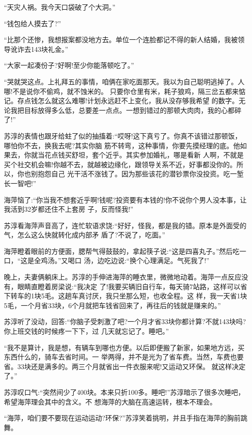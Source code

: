 \documentclass[11pt,a4paper,onecolumn]{article}
\begin{document}
``天灾人祸。我今天口袋破了个大洞。''

``钱包给人摸去了?''

``比那个还惨，我想报案都没地方去。单位一个连脸都记不得的新人结婚，我被领导讹诈去143块礼金。''

``大家一起凑份子?好啊!至少你能落顿吃了。''

``哭就哭这点。上礼拜五的事情，咱俩在家吃面那天。我以为自己聪明逃掉了。人哪!不是说你不偷鸡，就不蚀米的。
只要你仓里有米，耗子狼鸡，隔三岔五都来惦记。存点钱怎么就这么难哪!计划永远赶不上变化，我从没存够我希望
的数字。无论我把目标放得多么低，总要差一点点。一想到错过的那顿大肉肉，我的心都碎了!''

苏淳的表情也跟牙给蛀了似的抽搐着:``哎呀!这下真亏了。你真不该错过那顿饭，哪怕你不去，换我去呢?其实你脑
筋不转弯，这种事情，你要先摸经理的底。他如果去，你就当花点钱买舒坦，套个近乎。其实参加婚礼，哪是看新
人啊，不就是买个社交机会嘛!你越不去，就越被边缘化，跟领导关系不近，好事都没你的。所以，你也别抱怨自己
光干活不涨钱了。因为那些该花的潜钞票你没投资。吃一堑长一智吧!''

海萍恼了:``你当我不想套近乎啊!钱呢?投资要有本钱的!你不说你个男人没本事，让我活到32岁都还住不上套房
子，反而怪我!''

苏淳看海萍声音高了，连忙软语求饶:``好好，怪我，都是我的错。原本是外面受的气，怎么这么快就转化成内部矛
盾了?不说了，吃面。''

海萍瞪着眼前的方便面，腮帮气得鼓鼓的，拿起筷子说:``这是四喜丸子。''然后吃一口，``这是全鸡汤。''又喝口
汤，边吃边说:``换个心理满足。气死我了!''

晚上，夫妻俩躺床上。苏淳的手伸进海萍的睡衣里，微微地动着。海萍一点反应没有，眼睛直瞪着房梁说:``我决定
了!我要买辆旧自行车，每天骑7站路，这样可以省下转车的1块5毛。这趟车真讨厌，我只坐那么短，也收全程。这
样，我一天省1块5毛，一个月省33块，6个月就把车钱省回来了，再往后的钱就是赚来的。''

苏淳听了没动，回答:``你脑子受刺激了吧?一个月才省33块你都计算?不就143块吗?你上班交钱的时候疼一下下，过
几天就忘记了。睡吧。''

``我不是算计，我是想，有辆车到哪也方便。以后即便搬了新家，如果地方远，买东西什么的，骑车去省时间。一
举两得，并不是光为了省车费。当然，车费也要省。33块还是满多的。两三个月就省出一件衣服来呢!又运动又环保。
就这样决定了。''

苏淳叹口气:``突然间少了400块。本来只折100多。睡吧!''苏淳暗示了很多次睡吧，希望海萍理会其中的含义。不
想海萍的大脑在高速运转，根本不理会。

``海萍，咱们要不要现在运动运动?环保?''苏淳笑着挑明，并且手指在海萍的胸前跳舞。
\end{document}
